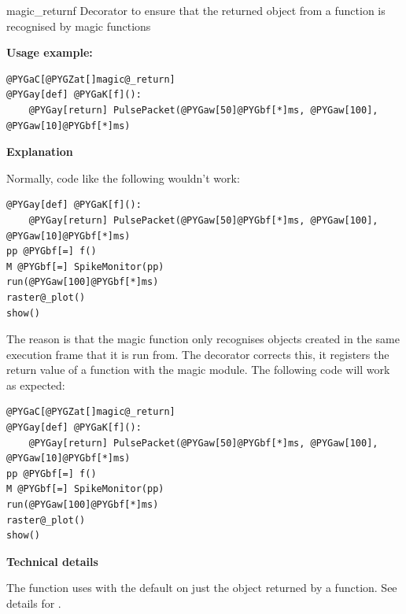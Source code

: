 \documentclass[letterpaper,10pt,english]{manual}
\begin{document}
\hypertarget{brian.magic_return}{}\begin{funcdesc}{magic\_return}{f}
Decorator to ensure that the returned object from a function is recognised by magic functions

\textbf{Usage example:}

\begin{Verbatim}[commandchars=@\[\]]
@PYGaC[@PYGZat[]magic@_return]
@PYGay[def] @PYGaK[f]():
    @PYGay[return] PulsePacket(@PYGaw[50]@PYGbf[*]ms, @PYGaw[100], @PYGaw[10]@PYGbf[*]ms)
\end{Verbatim}

\textbf{Explanation}

Normally, code like the following wouldn't work:

\begin{Verbatim}[commandchars=@\[\]]
@PYGay[def] @PYGaK[f]():
    @PYGay[return] PulsePacket(@PYGaw[50]@PYGbf[*]ms, @PYGaw[100], @PYGaw[10]@PYGbf[*]ms)
pp @PYGbf[=] f()
M @PYGbf[=] SpikeMonitor(pp)
run(@PYGaw[100]@PYGbf[*]ms)
raster@_plot()
show()
\end{Verbatim}

The reason is that the magic function \hyperlink{brian.run}{} only recognises objects created
in the same execution frame that it is run from. The \hyperlink{brian.magic_return}{} decorator
corrects this, it registers the return value of a function with the magic
module. The following code will work as expected:

\begin{Verbatim}[commandchars=@\[\]]
@PYGaC[@PYGZat[]magic@_return]
@PYGay[def] @PYGaK[f]():
    @PYGay[return] PulsePacket(@PYGaw[50]@PYGbf[*]ms, @PYGaw[100], @PYGaw[10]@PYGbf[*]ms)
pp @PYGbf[=] f()
M @PYGbf[=] SpikeMonitor(pp)
run(@PYGaw[100]@PYGbf[*]ms)
raster@_plot()
show()
\end{Verbatim}

\textbf{Technical details}

The \hyperlink{brian.magic_return}{} function uses \hyperlink{brian.magic_register}{} with the default 
on just the object returned by a function. See details for \hyperlink{brian.magic_register}{}.
\end{funcdesc}
\end{document}
